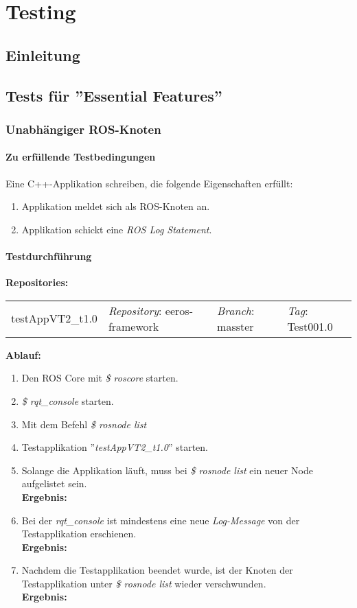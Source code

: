 \chapter{Testing}
\section{Einleitung}

\section{Tests für ''Essential Features''}
\subsection{Unabhängiger ROS-Knoten}
\subsubsection{Zu erfüllende Testbedingungen}
Eine C++-Applikation schreiben, die folgende Eigenschaften erfüllt:
\begin{enumerate}
\item Applikation meldet sich als ROS-Knoten an.
\item Applikation schickt eine \textit{ROS Log Statement}.
\end{enumerate}

\subsubsection{Testdurchführung}
\textbf{Repositories:} \\
\begin{tabular}
  { l						| l			 							l								 l								}
  testAppVT2\_t1.0			& \textit{Repository}: eeros-framework	& \textit{Branch}: masster		& \textit{Tag}: Test001.0 		\\
\end{tabular}

\textbf{Ablauf: }
\begin{enumerate}
\item Den ROS Core mit \textit{\$ roscore} starten.
\item \textit{\$ rqt\_console} starten.
\item Mit dem Befehl \textit{\$ rosnode list} 
\item Testapplikation ''\textit{testAppVT2\_t1.0}'' starten.
\item Solange die Applikation läuft, muss bei \textit{\$ rosnode list} ein neuer Node aufgelistet sein. \\
\textbf{Ergebnis:} \checkmark
\item Bei der \textit{rqt\_console} ist mindestens eine neue \textit{Log-Message} von der Testapplikation erschienen. \\
\textbf{Ergebnis:} \checkmark
\item Nachdem die Testapplikation beendet wurde, ist der Knoten der Testapplikation unter \textit{\$ rosnode list} wieder verschwunden. \\
\textbf{Ergebnis:} \checkmark
\end{enumerate}


